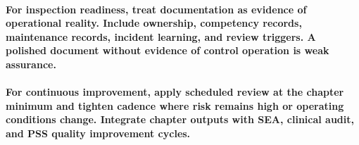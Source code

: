 \paragraph{For inspection readiness, treat documentation as evidence of operational reality. Include ownership, competency records, maintenance records, incident learning, and review triggers. A polished document without evidence of control operation is weak assurance.}

\paragraph{For continuous improvement, apply scheduled review at the chapter minimum and tighten cadence where risk remains high or operating conditions change. Integrate chapter outputs with SEA, clinical audit, and PSS quality improvement cycles.}


